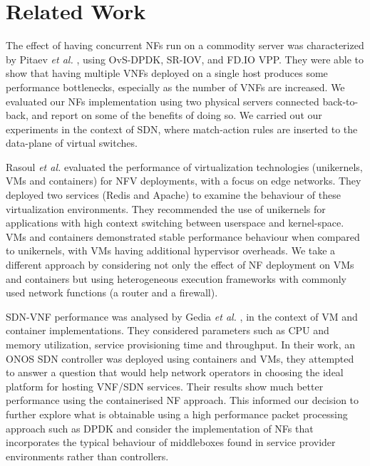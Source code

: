 \documentclass[conference]{IEEEtran}
\begin{document}
\section{Related Work}
\label{Related Work}

The effect of having concurrent NFs run on a commodity server was characterized by Pitaev \textit{et al.} \cite{pitaev2018characterizing}, using OvS-DPDK, SR-IOV, and FD.IO VPP. They were able to show that having multiple VNFs deployed on a single host produces some performance bottlenecks, especially as the number of VNFs are increased. We evaluated our NFs implementation using two physical servers connected back-to-back, and report on some of the benefits of doing so. We carried out our experiments in the context of SDN, where match-action rules are inserted to the data-plane of virtual switches. 

Rasoul \textit{et al.} \cite{behravesh2019performance} evaluated the performance of virtualization technologies (unikernels, VMs and containers) for NFV deployments, with a focus on edge networks. They deployed two services (Redis and Apache) to examine the behaviour of these virtualization environments. They recommended the use of unikernels for applications with high context switching between userspace and kernel-space. VMs and containers demonstrated stable performance behaviour when compared to unikernels, with VMs having additional hypervisor overheads. We take a different approach by considering not only the effect of NF deployment on VMs and containers but using heterogeneous execution frameworks with commonly used network functions (a router and a firewall).

SDN-VNF performance was analysed by Gedia \textit{et al.} \cite{gedia2018performance}, in the context of VM and container implementations. They considered parameters such as CPU and memory utilization, service provisioning time and throughput. In their work, an ONOS SDN controller was deployed using containers and VMs, they attempted to answer a question that would help network operators in choosing the ideal platform for hosting VNF/SDN services. Their results show much better performance using the containerised NF approach. This informed our decision to further explore what is obtainable using a high performance packet processing approach such as DPDK and consider the implementation of NFs that incorporates the typical behaviour of middleboxes found in service provider environments rather than controllers. 
\end{document}
